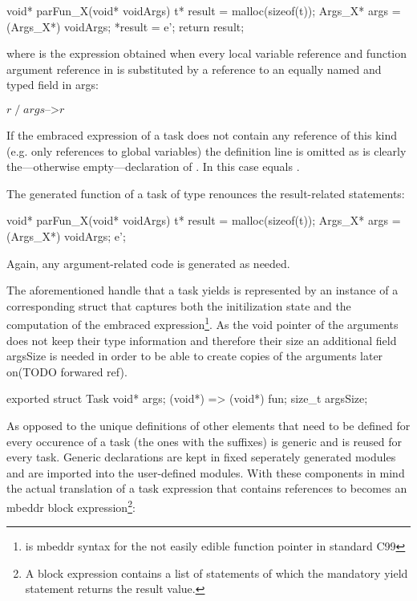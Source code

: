 \begin{ccode}
void* parFun_X(void* voidArgs) {
  t* result = malloc(sizeof(t));
  Args_X* args = (Args_X*) voidArgs;
  *result = e';
  return result;
}
\end{ccode}

where  is the expression obtained when every local variable reference and function argument reference  in  is substituted by a reference to an equally named and typed field in args:

$r\;/\;args\text{-->}r$

If the embraced expression of a task does not contain any reference of this kind (e.g. only references to global variables) the  definition line is omitted as is clearly the---otherwise empty---declaration of . In this case  equals .

The generated function of a task of type  renounces the result-related statements:

\begin{ccode}
void* parFun_X(void* voidArgs) {
  t* result = malloc(sizeof(t));
  Args_X* args = (Args_X*) voidArgs;
  e';
}
\end{ccode}

Again, any argument-related code is generated as needed.

The aforementioned handle that a task yields is represented by an instance of a corresponding struct that captures both the initilization state and the computation of the embraced expression\footnote{ is mbeddr syntax for the not easily edible function pointer  in standard C99}. As the void pointer of the arguments does not keep their type information and therefore their size an additional field argsSize is needed in order to be able to create copies of the arguments later on(TODO forwared ref).
\begin{ccode}
exported struct Task {
  void* args;
  (void*) => (void*) fun;
  size_t argsSize;
}
\end{ccode}

As opposed to the unique definitions of other elements that need to be defined for every occurence of a task (the ones with the  suffixes)  is generic and is reused for every task. Generic declarations are kept in fixed seperately generated modules and are imported into the user-defined modules.
With these components in mind the actual translation of a task expression  that contains references  to  becomes an mbeddr block expression\footnote{A block expression contains a list of statements of which the mandatory yield statement returns the result value.}:

